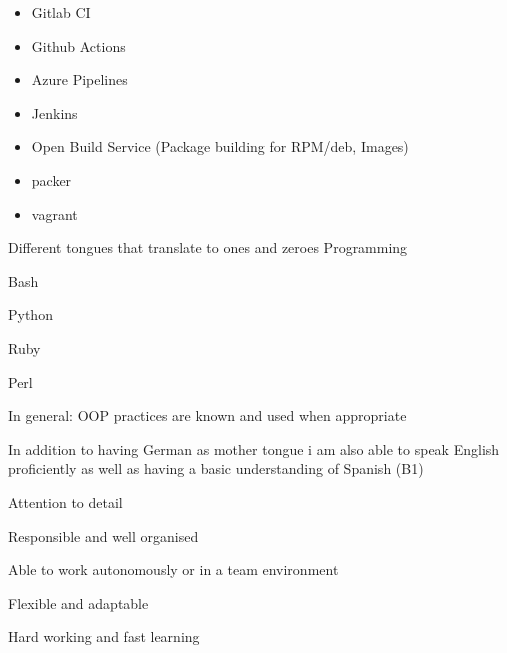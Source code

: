 \begin{cventries}
{\begin{cvitems}
        \begin{itemize}
          \item Gitlab CI
          \item Github Actions
          \item Azure Pipelines
          \item Jenkins
          \item Open Build Service (Package building for RPM/deb, Images)
          \item packer
          \item vagrant
        \end{itemize}
      \end{cvitems}
    }

  \cventry
    {Different tongues that translate to ones and zeroes}
    {Programming}
    {}
    {}
    {
      \begin{cvitems}
        \item Bash
        \item Python
        \item Ruby
        \item Perl
        \item In general: OOP practices are known and used when appropriate
      \end{cvitems}
    }

\end{cventries}


\begin{cvparagraph}
In addition to having German as mother tongue i am also able to speak English proficiently as well as having a basic understanding of Spanish (B1)
\end{cvparagraph}

\newline

\begin{cvparagraph}

\begin{cvitems}
  \item Attention to detail
  \item Responsible and well organised
  \item Able to work autonomously or in a team environment
  \item Flexible and adaptable
  \item Hard working and fast learning
\end{cvitems}
\end{cvparagraph}



